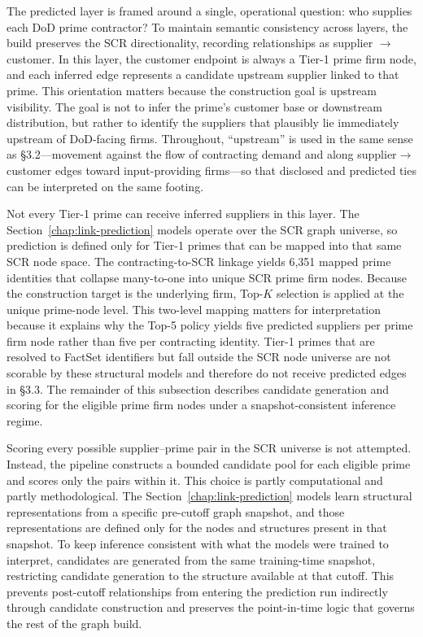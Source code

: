 The predicted layer is framed around a single, operational question: who supplies each DoD prime contractor? To maintain semantic consistency across layers, the build preserves the SCR directionality, recording relationships as supplier $\rightarrow$ customer. In this layer, the customer endpoint is always a Tier-1 prime firm node, and each inferred edge represents a candidate upstream supplier linked to that prime. This orientation matters because the construction goal is upstream visibility. The goal is not to infer the prime's customer base or downstream distribution, but rather to identify the suppliers that plausibly lie immediately upstream of DoD-facing firms. Throughout, ``upstream'' is used in the same sense as \S3.2---movement against the flow of contracting demand and along supplier$\rightarrow$customer edges toward input-providing firms---so that disclosed and predicted ties can be interpreted on the same footing.

Not every Tier-1 prime can receive inferred suppliers in this layer. The Section~\ref{chap:link-prediction} models operate over the SCR graph universe, so prediction is defined only for Tier-1 primes that can be mapped into that same SCR node space. The contracting-to-SCR linkage yields 6{,}351 mapped prime identities that collapse many-to-one into \NumPrimes unique SCR prime firm nodes. Because the construction target is the underlying firm, Top-$K$ selection is applied at the unique prime-node level. This two-level mapping matters for interpretation because it explains why the Top-5 policy yields five predicted suppliers per prime firm node rather than five per contracting identity. Tier-1 primes that are resolved to FactSet identifiers but fall outside the SCR node universe are not scorable by these structural models and therefore do not receive predicted edges in \S3.3. The remainder of this subsection describes candidate generation and scoring for the \NumPrimes eligible prime firm nodes under a snapshot-consistent inference regime.

Scoring every possible supplier--prime pair in the SCR universe is not attempted. Instead, the pipeline constructs a bounded candidate pool for each eligible prime and scores only the pairs within it. This choice is partly computational and partly methodological. The Section~\ref{chap:link-prediction} models learn structural representations from a specific pre-cutoff graph snapshot, and those representations are defined only for the nodes and structures present in that snapshot. To keep inference consistent with what the models were trained to interpret, candidates are generated from the same training-time snapshot, restricting candidate generation to the structure available at that cutoff. This prevents post-cutoff relationships from entering the prediction run indirectly through candidate construction and preserves the point-in-time logic that governs the rest of the graph build.

